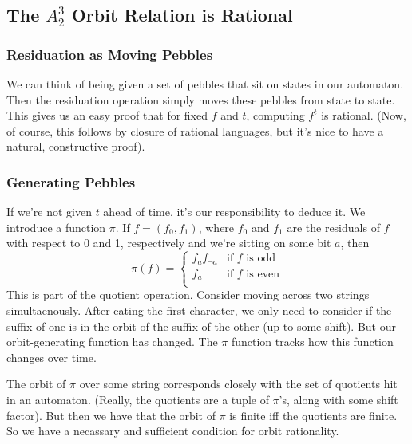 \documentclass[11pt]{article}
\theoremstyle{pleasant}
\newcommand{\0}{\underline{0}}
\newcommand{\1}{\underline{1}}
\newcommand{\2}{\underline{2}}
\begin{document}

\subsection*{The $A^3_2$ Orbit Relation is Rational}

\subsubsection*{Residuation as Moving Pebbles}
We can think of being given a set of pebbles that sit on states in our automaton. Then the residuation operation simply moves these pebbles from state to state. This gives us an easy proof that for fixed $f$ and $t$, computing $f^t$ is rational. (Now, of course, this follows by closure of rational languages, but it's nice to have a natural, constructive proof).

\subsubsection*{Generating Pebbles}
If we're not given $t$ ahead of time, it's our responsibility to deduce it. We introduce a function $\pi$. If $f = (f_0, f_1)$, where $f_0$ and $f_1$ are the residuals of $f$ with respect to 0 and 1, respectively and we're sitting on some bit $a$, then
$$\pi(f) = \begin{cases}
f_af_{\neg a} & \text{if $f$ is odd} \\
f_a & \text{if $f$ is even} \\
\end{cases}$$
This is part of the quotient operation. Consider moving across two strings simultaenously. After eating the first character, we only need to consider if the suffix of one is in the orbit of the suffix of the other (up to some shift). But our orbit-generating function has changed. The $\pi$ function tracks how this function changes over time.

The orbit of $\pi$ over some string corresponds closely with the set of quotients hit in an automaton. (Really, the quotients are a tuple of $\pi$'s, along with some shift factor). But then we have that the orbit of $\pi$ is finite iff the quotients are finite. So we have a necassary and sufficient condition for orbit rationality.
\end{document}
